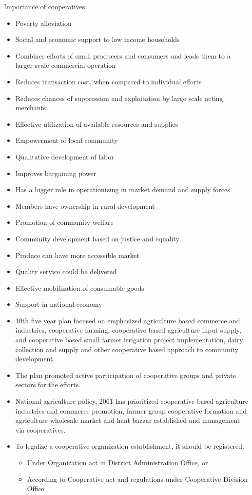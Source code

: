 \documentclass[
  openany]{book}
\providecommand{\tightlist}{%
  \setlength{\itemsep}{0pt}\setlength{\parskip}{0pt}}
\begin{document}
Importance of cooperatives

\begin{itemize}
\item
  Poverty alleviation
\item
  Social and economic support to low income households
\item
  Combines efforts of small producers and consumers and leads them to a larger scale commercial operation
\item
  Reduces transaction cost, when compared to individual efforts
\item
  Reduces chances of suppression and exploitation by large scale acting merchants
\item
  Effective utilization of available resources and supplies
\item
  Empowerment of local community
\item
  Qualitative development of labor
\item
  Improves bargaining power
\item
  Has a bigger role in operationizing in market demand and supply forces
\item
  Members have ownership in rural development
\item
  Promotion of community welfare
\item
  Community development based on justice and equality
\item
  Produce can have more accessible market
\item
  Quality service could be delivered
\item
  Effective mobilization of consumable goods
\item
  Support in national economy
\item
  10th five year plan focused on emphasized agriculture based commerce and industries, cooperative farming, cooperative based agriculture input supply, and cooperative based small farmer irrigation project implementation, dairy collection and supply and other cooperative based approach to community development.
\item
  The plan promoted active participation of cooperative groups and private sectors for the efforts.
\item
  National agriculture policy, 2061 has prioritized cooperative based agriculture industries and commerce promotion, farmer group cooperative formation and agriculture wholesale market and haat bazzar established and management via cooperatives.
\item
  To legalize a cooperative organization establishment, it should be registered:

  \begin{itemize}
  \tightlist
  \item
    Under Organization act in District Administration Office, or
  \item
    According to Cooperative act and regulations under Cooperative Division Office.
  \end{itemize}
\end{itemize}
\end{document}
